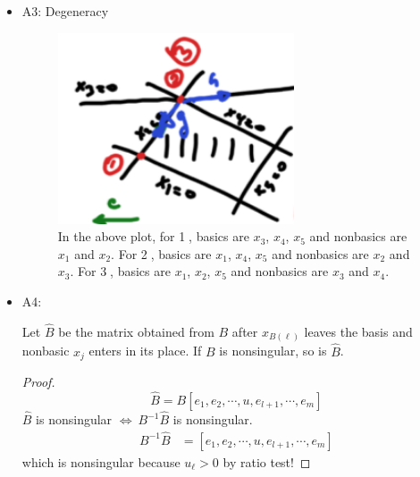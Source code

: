 \documentclass[11pt]{article}
\numberwithin{equation}{section}
\begin{document}
\begin{itemize}
\begin{proposition}
\begin{proof}
\begin{align*}
            \end{align*}
            $\bar{y}=c_B^\top B^{-1}$ is feasible for (D). Check the primal, dual objectives: \begin{align*}
                c^\top \bar{x} &= c_B^\top \bar{x}_B + c_{N}^{\top} \bar{x}_N \\
                &= c^\top_B B^{-1} b + 0 \\
                y^{\top} b &= c^\top_B B^{-1} b
            \end{align*}
            Alternatively, observe that $\bar{x}^\top \bar{s}=0$, where \begin{align*}
                \bar{s}^\top &= c^\top - \bar{y}^\top A \\
                \bar{x}_B &= B^{-1} b, \ \bar{x}_N = 0\\
                \bar{x}_B &= 0, \ \bar{s}_N \geq 0
            \end{align*}
        \end{proof}
    \end{proposition}
    \item A3: Degeneracy \begin{figure}[H]
        \centering
        \includegraphics[width = 7cm]{images/7-ex-4.png}
        \caption{In the above plot, for \textcircled{1}, basics are $x_3$, $x_4$, $x_5$ and nonbasics are $x_1$ and $x_2$. For \textcircled{2}, basics are $x_1$, $x_4$, $x_5$ and nonbasics are $x_2$ and $x_3$.
        For \textcircled{3}, basics are $x_1$, $x_2$, $x_5$ and nonbasics are $x_3$ and $x_4$.}
    \end{figure}
    \item A4: \begin{proposition}
        Let $\hat{B}$ be the matrix obtained from $B$ after $x_{B(\ell)}$ leaves the basis and nonbasic $x_j$ enters in its place. If $B$ is nonsingular, so is $\hat{B}$.
        \begin{proof}
            $$\hat{B}=B\left[ e_1, e_2, \cdots, u, e_{l+1}, \cdots, e_m \right]$$
            $\hat{B}$ is nonsingular $\iff \ B^{-1}\hat{B}$ is nonsingular. \begin{align*}
                B^{-1}\hat{B} &= \left[ e_1, e_2, \cdots, u, e_{l+1}, \cdots, e_m \right] 
            \end{align*} which is nonsingular because $u_{\ell} > 0$ by ratio test!
        \end{proof}
    \end{proposition}
\end{itemize}
\end{document}
